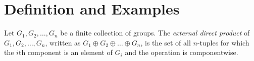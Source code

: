 \section{Definition and Examples}

\begin{definition}
	Let $G_1,G_2,\dots,G_n$ be a finite collection of groups. The \textit{external direct product} of $G_1,G_2,\dots,G_n$, written as $G_1 \oplus G_2 \oplus \dots \oplus G_n$, is the set of all $n$-tuples for which the $i$th component is an element of $G_i$ and the operation is componentwise.
\end{definition}

